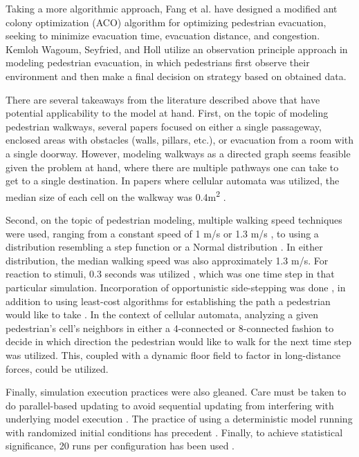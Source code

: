 \documentclass[12pt]{article}
\begin{document}
Taking a more algorithmic approach, Fang et al. \cite{fang2011hierarchical} have
designed a modified ant colony optimization (ACO) algorithm for optimizing
pedestrian evacuation, seeking to minimize evacuation time, evacuation distance,
and congestion. Kemloh Wagoum, Seyfried, and Holl \cite{kemloh2012modeling}
utilize an observation principle approach in modeling pedestrian evacuation,
in which pedestrians first observe their environment and then make a final
decision on strategy based on obtained data.

There are several takeaways from the literature described above that have
potential applicability to the model at hand. First, on the topic of modeling
pedestrian walkways, several papers focused on either a single passageway,
enclosed areas with obstacles (walls, pillars, etc.), or evacuation from a
room with a single doorway. However, modeling walkways as a directed graph
\cite{fang2011hierarchical} seems feasible given the problem at hand, where
there are multiple pathways one can take to get to a single destination. In
papers where cellular automata was utilized, the median size of each cell on the
walkway was 0.4m\textsuperscript{2}
\cite{blue2001cellular,burstedde2001simulation,weifeng2003simulation}.

Second, on the topic of pedestrian modeling, multiple walking speed techniques
were used, ranging from a constant speed of 1 m/s \cite{weifeng2003simulation}
or 1.3 m/s \cite{burstedde2001simulation}, to using a distribution resembling a
step function \cite{blue2001cellular} or a Normal distribution
\cite{klupfel2005models}. In either distribution, the median walking speed was
also approximately 1.3 m/s. For reaction to stimuli, 0.3 seconds was utilized
\cite{burstedde2001simulation}, which was one time step in that particular
simulation. Incorporation of opportunistic side-stepping was done
\cite{blue2001cellular}, in addition to using least-cost algorithms for
establishing the path a pedestrian would like to take
\cite{fang2011hierarchical}. In the context of cellular automata, analyzing a
given pedestrian's cell's neighbors in either a 4-connected
\cite{weifeng2003simulation} or 8-connected fashion
\cite{burstedde2001simulation} to decide in which direction the pedestrian would
like to walk for the next time step was utilized. This, coupled with a dynamic
floor field \cite{burstedde2001simulation} to factor in long-distance forces,
could be utilized.

Finally, simulation execution practices were also gleaned. Care must be taken
to do parallel-based updating to avoid sequential updating from interfering with
underlying model execution \cite{blue2001cellular}. The practice of using
a deterministic model running with randomized initial conditions has precedent
\cite{biham1992self}. Finally, to achieve statistical significance, 20 runs per
configuration has been used \cite{blue2001cellular}.
\end{document}
